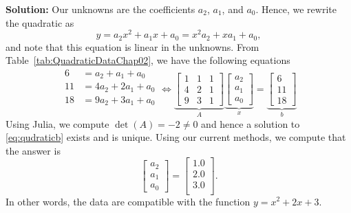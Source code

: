 \textbf{Solution:} Our unknowns are the coefficients $a_2$, $a_1$, and $a_0$. Hence, we rewrite the quadratic as
 $$ y = a_2 x^2 + a_1 x + a_0 = x^2 a_2  + x a_1  + a_0, $$
and note that this equation is linear in the unknowns.
From Table~\ref{tab:QuadraticDataChap02}, we have the following equations
\begin{equation}
\label{eq:qudraticb}
\begin{aligned}
6 &= a_2 + a_1 + a_0 \\
11&= 4 a_2 + 2 a_1 + a_0\\
18&= 9 a_2 + 3 a_1 + a_0\\
\end{aligned}
\iff \underbrace{\left[\begin{array}{rrr} 1 & 1 & 1 \\
4& 2 & 1  \\ 9 & 3 & 1\end{array}\right]}_{A} \underbrace{\left[\begin{array}{c} a_2\\ a_1 \\ a_0\end{array}\right]}_{x} =   \underbrace{\left[\begin{array}{c} 6\\ 11\\ 18 \end{array}\right]}_{b}
\end{equation}
Using Julia, we compute $\det(A)=-2 \neq 0$ and hence a solution to \eqref{eq:qudraticb} exists and is unique. Using our current methods, we compute that the answer is
$$\left[\begin{array}{c} a_2\\ a_1 \\ a_0\end{array}\right] =  \left[
\begin{array}{c}
1.0 \\
2.0\\
3.0 \\
\end{array}
\right].$$
In other words, the data are compatible with the function $y=x^2 + 2 x + 3$. 
\Qed

\vspace*{.2cm}

